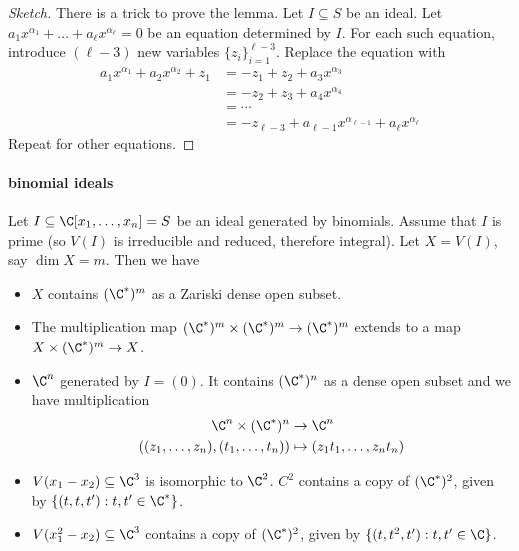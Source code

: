 \documentclass[a4paper]{article}
\begin{document}
\begin{proof}[Sketch]
  There is a trick to prove the lemma. Let \(I \subseteq S\) be an ideal. Let \(a_1 x^{\alpha_1} + \dots + a_\ell x^{\alpha_\ell} = 0\) be an equation determined by \(I\). For each such equation, introduce \((\ell - 3)\) new variables \(\{z_i\}_{i = 1}^{\ell - 3}\). Replace the equation with
  \begin{align*}
    a_1 x^{\alpha_1} + a_2 x^{\alpha_2} + z_1
    &= -z_1 + z_2 + a_3 x^{\alpha_3} \\
    &= -z_2 + z_3 + a_4 x^{\alpha_4} \\
    &= \cdots \\
    &= -z_{\ell - 3} + a_{\ell - 1} x^{\alpha_{\ell - 1}} + a_\ell x^{\alpha_\ell}
  \end{align*}
  Repeat for other equations.
\end{proof}

\paragraph{binomial ideals}

Let \(I \subseteq \C[x_1, \dots, x_n] = S\) be an ideal generated by binomials. Assume that \(I\) is prime (so \(V(I)\) is irreducible and reduced, therefore integral). Let \(X = V(I)\), say \(\dim X = m\). Then we have
\begin{itemize}
\item \(X\) contains \((\C^*)^m\) as a Zariski dense open subset.
\item The multiplication map \((\C^*)^m \times (\C^*)^m \to (\C^*)^m\) extends to a map \(X \times (\C^*)^m \to X\).
\end{itemize}

\begin{eg}\leavevmode
  \begin{itemize}
  \item \(\C^n\) generated by \(I = (0)\). It contains \((\C^*)^n\) as a dense open subset and we have multiplication
    \begin{align*}
      \C^n \times (\C^*)^n &\to \C^n \\
      ((z_1, \dots, z_n), (t_1, \dots, t_n)) &\mapsto (z_1t_1, \dots, z_nt_n)
    \end{align*}
  \item \(V(x_1 - x_2) \subseteq \C^3\) is isomorphic to \(\C^2\). \(C^2\) contains a copy of \((\C^*)^2\), given by \(\{(t, t, t'): t, t' \in \C^*\}\).
  \item \(V(x_1^2 - x_2) \subseteq \C^3\) contains a copy of \((\C^*)^2\), given by \(\{(t, t^2, t'): t, t' \in \C\}\).
  \end{itemize}
\end{eg}
\end{document}
